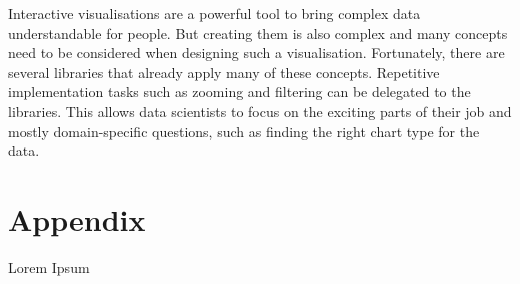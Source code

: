 \documentclass[11pt]{article}
\begin{document}
Interactive visualisations are a powerful tool to bring complex data understandable for people. But creating them is also complex and many concepts need to be considered when designing such a visualisation. Fortunately, there are several libraries that already apply many of these concepts. Repetitive implementation tasks such as zooming and filtering can be delegated to the libraries. This allows data scientists to focus on the exciting parts of their job and mostly domain-specific questions, such as finding the right chart type for the data.

\pagebreak
\section{Appendix}
Lorem Ipsum

\pagebreak
\printbibliography
\end{document}
